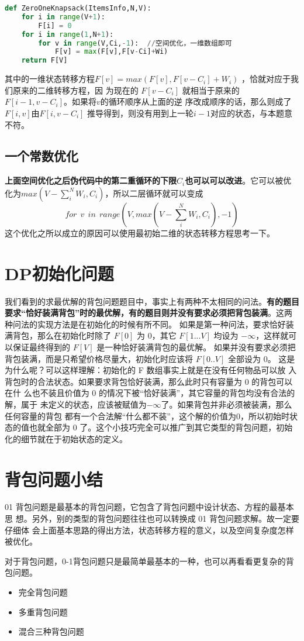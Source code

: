 \begin{lstlisting}[language=python, caption = 优化空间复杂度--二层循环倒序]
def ZeroOneKnapsack(ItemsInfo,N,V):
    for i in range(V+1):
        F[i] = 0
    for i in range(1,N+1):
        for v in range(V,Ci,-1):  //空间优化，一维数组即可
            F[v] = max(F[v],F[v-Ci]+Wi) 
    return F[V]
\end{lstlisting}

其中的一维状态转移方程$F[v] = max(F[v], F[v-C_i] + W_i)$ ，恰就对应于我们原来的二维转移方程，因
为现在的 $F[v-C_i]$ 就相当于原来的 $F[i-1, v-C_i]$。如果将$ v $的循环顺序从上面的逆
序改成顺序的话，那么则成了 $F[i, v] 由 F[i, v-C_i]$ 推导得到，则没有用到上一轮$i-1$对应的状态，与本题意不符。

\subsection{一个常数优化}
\textbf{上面空间优化之后伪代码中的第二重循环的下限$C_i$也可以可以改进}。它可以被优化为$max(V-\sum_{i}^{N}W_i,C_i)$，所以二层循环就可以变成
$$
for \ \ v \ \ in \ \ range(V,max(V-\sum_{i}^{N}W_i,C_i),-1)
$$
这个优化之所以成立的原因可以使用最初始二维的状态转移方程思考一下。

\section{DP初始化问题}
我们看到的求最优解的背包问题题目中，事实上有两种不太相同的问法。\textbf{有的题目
要求“恰好装满背包”时的最优解，有的题目则并没有要求必须把背包装满}。这两种问法的实现方法是在初始化的时候有所不同。
如果是第一种问法，要求恰好装满背包，那么在初始化时除了 $F[0]$ 为 $0$，其它
$F[1...V]$ 均设为 $-\infty$，这样就可以保证最终得到的 $F[V]$ 是一种恰好装满背包的最优解。
如果并没有要求必须把背包装满，而是只希望价格尽量大，初始化时应该将 $F[0..V]$
全部设为 $0$。
这是为什么呢？可以这样理解：初始化的 F 数组事实上就是在没有任何物品可以放
入背包时的合法状态。如果要求背包恰好装满，那么此时只有容量为 $0$ 的背包可以在什
么也不装且价值为 $0$ 的情况下被“恰好装满”，其它容量的背包均没有合法的解，属于
未定义的状态，应该被赋值为$-\infty$了。如果背包并非必须被装满，那么任何容量的背包
都有一个合法解“什么都不装”，这个解的价值为$ 0$，所以初始时状态的值也就全部为 $0$
了。这个小技巧完全可以推广到其它类型的背包问题，初始化的细节就在于初始状态的定义。


\section{背包问题小结}
01 背包问题是最基本的背包问题，它包含了背包问题中设计状态、方程的最基本思
想。另外，别的类型的背包问题往往也可以转换成 01 背包问题求解。故一定要仔细体
会上面基本思路的得出方法，状态转移方程的意义，以及空间复杂度怎样被优化。

对于背包问题，0-1背包问题只是最简单最基本的一种，也可以再看看更复杂的背包问题。
\begin{itemize}
	\item 完全背包问题
	\item 多重背包问题
	\item 混合三种背包问题
\end{itemize}


